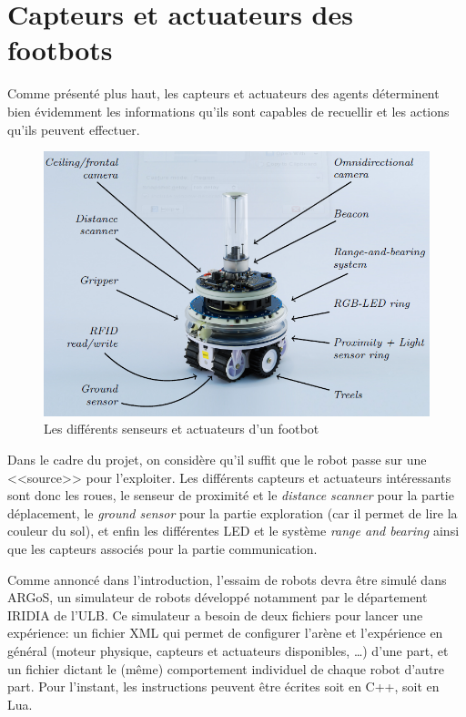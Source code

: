 \section{Capteurs et actuateurs des footbots}

Comme présenté plus haut, les capteurs et actuateurs des agents déterminent bien évidemment les informations qu'ils sont capables de recuellir et les actions qu'ils peuvent effectuer.

\begin{figure}[htb]
   \includegraphics[width=\textwidth]{footbot.png}
      \caption{Les différents senseurs et actuateurs d'un footbot~\cite{argosSite1}}
\end{figure}

Dans le cadre du projet, on considère qu'il suffit que le robot passe sur une <<source>> pour l'exploiter. Les différents capteurs et actuateurs intéressants sont donc les roues, le senseur de proximité et le \emph{distance scanner} pour la partie déplacement, le \emph{ground sensor} pour la partie exploration (car il permet de lire la couleur du sol), et enfin les différentes LED et le système \emph{range and bearing} ainsi que les capteurs associés pour la partie communication.

Comme annoncé dans l'introduction, l'essaim de robots devra être simulé dans ARGoS, un simulateur de robots développé notamment par le département IRIDIA de l'ULB. Ce simulateur a besoin de deux fichiers pour lancer une expérience: un fichier XML qui permet de configurer l'arène et l'expérience en général (moteur physique, capteurs et actuateurs disponibles, \ldots) d'une part, et un fichier dictant le (même) comportement individuel de chaque robot d'autre part. Pour l'instant, les instructions peuvent être écrites soit en C++, soit en Lua.


